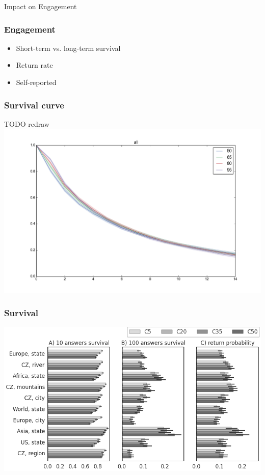 \documentclass[bigger]{beamer}
\begin{document}
\begin{frame}
	\begin{center}
    {\Huge Impact on Engagement} 
	\end{center}
\end{frame}

\begin{frame}
  \frametitle{Engagement}
	\begin{itemize}
		\item Short-term vs. long-term survival
		\item Return rate
		\item Self-reported
	\end{itemize}

\end{frame}


\begin{frame}
  \frametitle{Survival curve}
  TODO redraw
  \includegraphics[width=\textwidth]{img/survival-curve}
\end{frame}


\begin{frame}
  \frametitle{Survival}
  \includegraphics[width=\textwidth]{img/survival_by_context_ab}
\end{frame}
\end{document}

